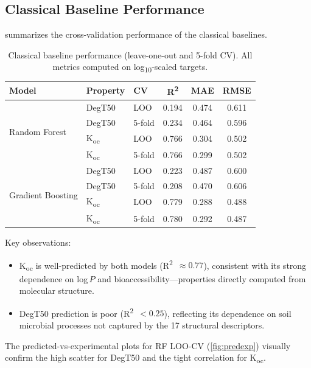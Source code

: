 \documentclass[12pt,a4paper]{article}
\newcommand{\degtl}{DegT50}
\newcommand{\koc}{K\textsubscript{oc}}
\newcommand{\rtwo}{R\textsuperscript{2}}
\newcommand{\loocv}{LOO-CV}
\newcommand{\nfeat}{17}
\begin{document}
\subsection{Classical Baseline Performance}
\label{sec:results_classical}

 summarizes the cross-validation performance of the
classical baselines.

\begin{table}[htbp]
  \centering
  \caption{Classical baseline performance (leave-one-out and 5-fold CV).
           All metrics computed on log\textsubscript{10}-scaled targets.}
  \label{tab:baselines}
  \small
  \begin{tabular}{lllccc}
    \toprule
    \textbf{Model} & \textbf{Property} & \textbf{CV} &
      \textbf{\rtwo{}} & \textbf{MAE} & \textbf{RMSE} \\
    \midrule
    \multirow{4}{*}{Random Forest}
      & \degtl{} & LOO    & 0.194 & 0.474 & 0.611 \\
      & \degtl{} & 5-fold & 0.234 & 0.464 & 0.596 \\
      & \koc{}   & LOO    & 0.766 & 0.304 & 0.502 \\
      & \koc{}   & 5-fold & 0.766 & 0.299 & 0.502 \\
    \midrule
    \multirow{4}{*}{Gradient Boosting}
      & \degtl{} & LOO    & 0.223 & 0.487 & 0.600 \\
      & \degtl{} & 5-fold & 0.208 & 0.470 & 0.606 \\
      & \koc{}   & LOO    & 0.779 & 0.288 & 0.488 \\
      & \koc{}   & 5-fold & 0.780 & 0.292 & 0.487 \\
    \bottomrule
  \end{tabular}
\end{table}

Key observations:
\begin{itemize}[nosep]
  \item \koc{} is well-predicted by both models (\rtwo{}~$\approx 0.77$),
        consistent with its strong dependence on log\,$P$ and
        bioaccessibility—properties directly computed from molecular
        structure.
  \item \degtl{} prediction is poor (\rtwo{}~$< 0.25$), reflecting its
        dependence on soil microbial processes not captured by the
        \nfeat{} structural descriptors.
\end{itemize}

The predicted-vs-experimental plots for RF \loocv{} (\cref{fig:predexp})
visually confirm the high scatter for \degtl{} and the tight correlation
for \koc{}.
\end{document}
